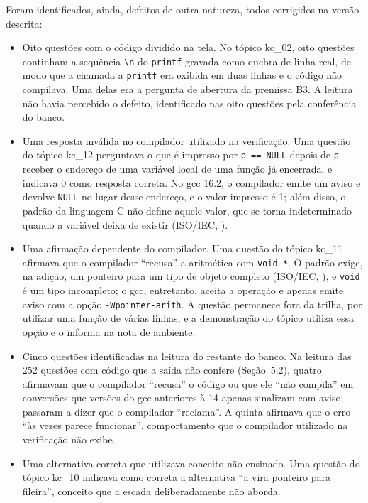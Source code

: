 Foram identificados, ainda, defeitos de outra natureza, todos corrigidos na versão descrita:

\begin{itemize}
\item Oito questões com o código dividido na tela. No tópico kc\_02, oito questões continham a sequência \texttt{\textbackslash{}n} do \texttt{printf} gravada como quebra de linha real, de modo que a chamada a \texttt{printf} era exibida em duas linhas e o código não compilava. Uma delas era a pergunta de abertura da premissa B3. A leitura não havia percebido o defeito, identificado nas oito questões pela conferência do banco.
\item Uma resposta inválida no compilador utilizado na verificação. Uma questão do tópico kc\_12 perguntava o que é impresso por \texttt{p == NULL} depois de \texttt{p} receber o endereço de uma variável local de uma função já encerrada, e indicava 0 como resposta correta. No gcc 16.2, o compilador emite um aviso e devolve \texttt{NULL} no lugar desse endereço, e o valor impresso é 1; além disso, o padrão da linguagem C não define aquele valor, que se torna indeterminado quando a variável deixa de existir (ISO/IEC, \citeyear{isoiec2011}).
\item Uma afirmação dependente do compilador. Uma questão do tópico kc\_11 afirmava que o compilador ``recusa'' a aritmética com \texttt{void *}. O padrão exige, na adição, um ponteiro para um tipo de objeto completo (ISO/IEC, \citeyear{isoiec2011}), e \texttt{void} é um tipo incompleto; o gcc, entretanto, aceita a operação e apenas emite aviso com a opção \texttt{-{}Wpointer-{}arith}. A questão permanece fora da trilha, por utilizar uma função de várias linhas, e a demonstração do tópico utiliza essa opção e o informa na nota de ambiente.
\item Cinco questões identificadas na leitura do restante do banco. Na leitura das 252 questões com código que a saída não confere (Seção~5.2), quatro afirmavam que o compilador ``recusa'' o código ou que ele ``não compila'' em conversões que versões do gcc anteriores à 14 apenas sinalizam com aviso; passaram a dizer que o compilador ``reclama''. A quinta afirmava que o erro ``às vezes parece funcionar'', comportamento que o compilador utilizado na verificação não exibe.
\item Uma alternativa correta que utilizava conceito não ensinado. Uma questão do tópico kc\_10 indicava como correta a alternativa ``a vira ponteiro para fileira'', conceito que a escada deliberadamente não aborda.

\end{itemize}
